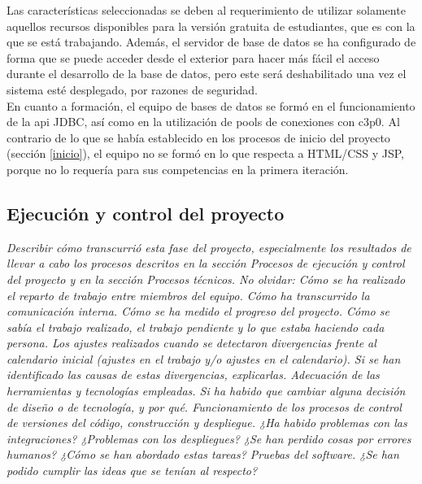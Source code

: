 Las características seleccionadas se deben al requerimiento de utilizar solamente aquellos recursos disponibles para la versión gratuita de estudiantes, que es con la que se está trabajando. Además, el servidor de base de datos se ha configurado de forma que se puede acceder desde el exterior para hacer más fácil el acceso durante el desarrollo de la base de datos, pero este será deshabilitado una vez el sistema esté desplegado, por razones de seguridad.\\

En cuanto a formación, el equipo de bases de datos se formó en el funcionamiento de la api JDBC, así como en la utilización de pools de conexiones con c3p0. Al contrario de lo que se había establecido en los procesos de inicio del proyecto (sección \ref{inicio}), el equipo no se formó en lo que respecta a HTML/CSS y JSP, porque no lo requería para sus competencias en la primera iteración.
\subsection{Ejecución y control del proyecto}
\label{Ejecucion y control del proyecto}
\emph{
Describir cómo transcurrió esta fase del proyecto, especialmente los resultados de llevar a cabo los procesos descritos en la sección Procesos de ejecución y control del proyecto y en la sección Procesos técnicos. No olvidar:
Cómo se ha realizado el reparto de trabajo entre miembros del equipo. Cómo ha transcurrido la comunicación interna. 
Cómo se ha medido el progreso del proyecto. Cómo se sabía el trabajo realizado, el trabajo pendiente y lo que estaba haciendo cada persona.
Los ajustes realizados cuando se detectaron divergencias frente al calendario inicial (ajustes en el trabajo y/o ajustes en el calendario). Si se han identificado las causas de estas divergencias, explicarlas.
Adecuación de las herramientas y tecnologías empleadas. Si ha habido que cambiar alguna decisión de diseño o de tecnología, y por qué.
Funcionamiento de los procesos de control de versiones del código, construcción y despliegue. ¿Ha habido problemas con las integraciones? ¿Problemas con los despliegues? ¿Se han perdido cosas por errores humanos? ¿Cómo se han abordado estas tareas?
Pruebas del software. ¿Se han podido cumplir las ideas que se tenían al respecto?}
